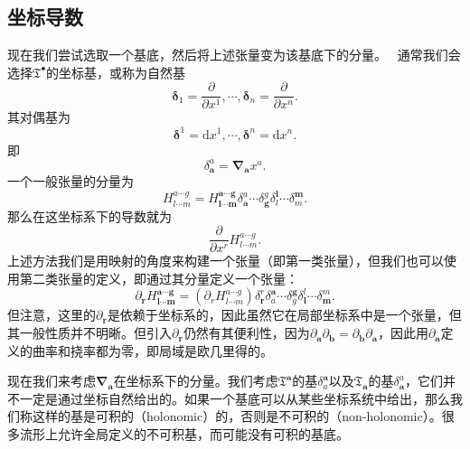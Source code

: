 \subsection{坐标导数}

现在我们尝试选取一个基底，然后将上述张量变为该基底下的分量。 \ 通常我们会选择$\mathfrak{T}^{\bullet }$的坐标基，或称为自然基
\begin{equation*}
	\boldsymbol{\delta }_{1} =\frac{\partial }{\partial x^{1}} ,\cdots ,\boldsymbol{\delta }_{n} =\frac{\partial }{\partial x^{n}} .
\end{equation*}
其对偶基为
\begin{equation*}
	\boldsymbol{\delta }^{1} =\mathrm{d} x^{1} ,\cdots ,\boldsymbol{\delta }^{n} =\mathrm{d} x^{n} .
\end{equation*}
即
\begin{equation*}
	\delta _{\boldsymbol{a}}^{a} =\boldsymbol{\nabla }_{\boldsymbol{a}} x^{a} .
\end{equation*}
一个一般张量的分量为
\begin{equation*}
	H_{l\cdots m}^{a\cdots g} =H_{\boldsymbol{l} \cdots \boldsymbol{m}}^{\boldsymbol{a} \cdots \boldsymbol{g}} \delta _{\boldsymbol{a}}^{a} \cdots \delta _{\boldsymbol{g}}^{g} \delta _{l}^{\boldsymbol{l}} \cdots \delta _{m}^{\boldsymbol{m}} .
\end{equation*}
那么在这坐标系下的导数就为
\begin{equation*}
	\frac{\partial }{\partial x^{r}} H_{l\cdots m}^{a\cdots g} .
\end{equation*}
上述方法我们是用映射的角度来构建一个张量（即第一类张量），但我们也可以使用第二类张量的定义，即通过其分量定义一个张量：
\begin{equation*}
	\partial _{\boldsymbol{r}} H_{\boldsymbol{l} \cdots \boldsymbol{m}}^{\boldsymbol{a} \cdots \boldsymbol{g}} =(\partial _{r} H_{l\cdots m}^{a\cdots g} )\delta _{\boldsymbol{r}}^{r} \delta _{a}^{\boldsymbol{a}} \cdots \delta _{g}^{\boldsymbol{g}} \delta _{\boldsymbol{l}}^{l} \cdots \delta _{\boldsymbol{m}}^{m} .
\end{equation*}
但注意，这里的$\partial _{\boldsymbol{r}}$是依赖于坐标系的，因此虽然它在局部坐标系中是一个张量，但其一般性质并不明晰。但引入$\partial _{\boldsymbol{r}}$仍然有其便利性，因为$\partial _{\boldsymbol{a}} \partial _{\boldsymbol{b}} =\partial _{\boldsymbol{b}} \partial _{\boldsymbol{a}}$，因此用$\partial _{\boldsymbol{a}}$定义的曲率和挠率都为零，即局域是欧几里得的。

现在我们来考虑$\boldsymbol{\nabla }_{\boldsymbol{a}}$在坐标系下的分量。我们考虑$\mathfrak{T}^{\boldsymbol{a}}$的基$\delta _{a}^{\boldsymbol{a}}$以及$\mathfrak{T}_{\boldsymbol{a}}$的基$\delta _{\boldsymbol{a}}^{a}$，它们并不一定是通过坐标自然给出的。如果一个基底可以从某些坐标系统中给出，那么我们称这样的基是可积的（holonomic）的，否则是不可积的（non-holonomic）。很多流形上允许全局定义的不可积基，而可能没有可积的基底。

